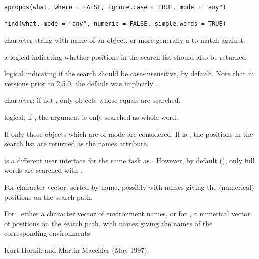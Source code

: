 %
\begin{Usage}
\begin{verbatim}
apropos(what, where = FALSE, ignore.case = TRUE, mode = "any")

find(what, mode = "any", numeric = FALSE, simple.words = TRUE)
\end{verbatim}
\end{Usage}
%
\begin{Arguments}
\begin{ldescription}
\item[\code{what}] character string with name of an object, or more generally
a  to match against.
\item[\code{where, numeric}] a logical indicating whether positions in the
search list should also be returned
\item[\code{ignore.case}] logical indicating if the search should be
case-insensitive,  by default.  Note that in \R{} versions
prior to 2.5.0, the default was implicitly .
\item[\code{mode}] character; if not , only objects whose
 equals  are searched.
\item[\code{simple.words}] logical; if , the  argument is
only searched as whole word.
\end{ldescription}
\end{Arguments}
%
\begin{Details}\relax
If  only those objects which are of mode 
are considered.
If  is , the positions in the search list are
returned as the names attribute.

 is a different user interface for the same task as
. However, by default (),
only full words are searched with .
\end{Details}
%
\begin{Value}
For  character vector, sorted by name, possibly with
names giving the (numerical) positions on the search path.

For , either a character vector of environment names, or for
, a numerical vector of positions on the search path,
with names giving the names of the corresponding environments.
\end{Value}
%
\begin{Author}\relax
Kurt Hornik and Martin Maechler (May 1997).
\end{Author}
